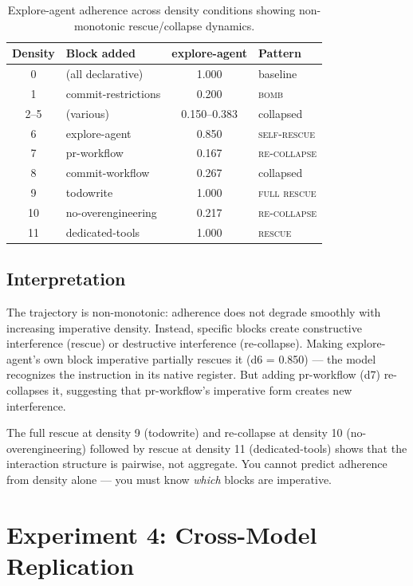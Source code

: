 \documentclass[11pt,a4paper]{article}
\begin{document}
\begin{table}[H]
\centering
\small
\begin{tabular}{clcl}
\toprule
Density & Block added & explore-agent & Pattern \\
\midrule
0 & (all declarative) & 1.000 & baseline \\
1 & commit-restrictions & 0.200 & \textsc{bomb} \\
2--5 & (various) & 0.150--0.383 & collapsed \\
6 & explore-agent & 0.850 & \textsc{self-rescue} \\
7 & pr-workflow & 0.167 & \textsc{re-collapse} \\
8 & commit-workflow & 0.267 & collapsed \\
9 & todowrite & 1.000 & \textsc{full rescue} \\
10 & no-overengineering & 0.217 & \textsc{re-collapse} \\
11 & dedicated-tools & 1.000 & \textsc{rescue} \\
\bottomrule
\end{tabular}
\caption{Explore-agent adherence across density conditions showing
non-monotonic rescue/collapse dynamics.}
\label{tab:density}
\end{table}

\subsection{Interpretation}

The trajectory is non-monotonic: adherence does not degrade smoothly
with increasing imperative density. Instead, specific blocks create
constructive interference (rescue) or destructive interference
(re-collapse). Making explore-agent's own block imperative partially
rescues it (d6 = 0.850) --- the model recognizes the instruction in
its native register. But adding pr-workflow (d7) re-collapses it,
suggesting that pr-workflow's imperative form creates new interference.

The full rescue at density 9 (todowrite) and re-collapse at density 10
(no-overengineering) followed by rescue at density 11 (dedicated-tools)
shows that the interaction structure is pairwise, not aggregate. You
cannot predict adherence from density alone --- you must know
\emph{which} blocks are imperative.

\section{Experiment 4: Cross-Model Replication}
\label{sec:xmodel}
\end{document}
